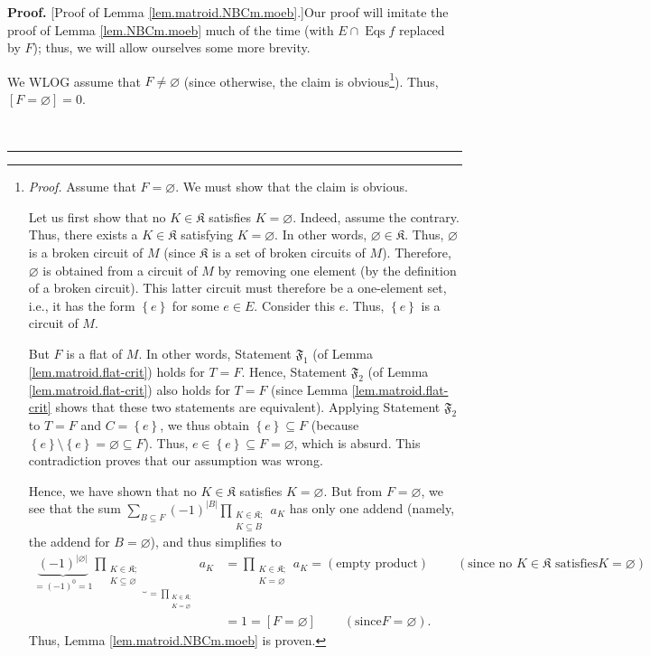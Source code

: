 \documentclass[numbers=enddot,12pt,final,onecolumn,notitlepage]{scrartcl}%
\theoremstyle{definition}
\newenvironment{proof}[1][Proof]{\noindent\textbf{#1.} }{\ \rule{0.5em}{0.5em}}
\let\sumnonlimits\sum
\let\prodnonlimits\prod
\renewcommand{\sum}{\sumnonlimits\limits}
\renewcommand{\prod}{\prodnonlimits\limits}
\begin{document}
\begin{proof}
[Proof of Lemma \ref{lem.matroid.NBCm.moeb}.]Our proof will imitate the proof
of Lemma \ref{lem.NBCm.moeb} much of the time (with $E\cap\operatorname*{Eqs}%
f$ replaced by $F$); thus, we will allow ourselves some more brevity.

We WLOG assume that $F\neq\varnothing$ (since otherwise, the claim is
obvious\footnote{\textit{Proof.} Assume that $F=\varnothing$. We must show
that the claim is obvious.
\par
Let us first show that no $K\in\mathfrak{K}$ satisfies $K=\varnothing$.
Indeed, assume the contrary. Thus, there exists a $K\in\mathfrak{K}$
satisfying $K=\varnothing$. In other words, $\varnothing\in\mathfrak{K}$.
Thus, $\varnothing$ is a broken circuit of $M$ (since $\mathfrak{K}$ is a set
of broken circuits of $M$). Therefore, $\varnothing$ is obtained from a
circuit of $M$ by removing one element (by the definition of a broken
circuit). This latter circuit must therefore be a one-element set, i.e., it
has the form $\left\{  e\right\}  $ for some $e\in E$. Consider this $e$.
Thus, $\left\{  e\right\}  $ is a circuit of $M$.
\par
But $F$ is a flat of $M$. In other words, Statement $\mathfrak{F}_{1}$ (of
Lemma \ref{lem.matroid.flat-crit}) holds for $T=F$. Hence, Statement
$\mathfrak{F}_{2}$ (of Lemma \ref{lem.matroid.flat-crit}) also holds for $T=F$
(since Lemma \ref{lem.matroid.flat-crit} shows that these two statements are
equivalent). Applying Statement $\mathfrak{F}_{2}$ to $T=F$ and $C=\left\{
e\right\}  $, we thus obtain $\left\{  e\right\}  \subseteq F$ (because
$\left\{  e\right\}  \setminus\left\{  e\right\}  =\varnothing\subseteq F$).
Thus, $e\in\left\{  e\right\}  \subseteq F=\varnothing$, which is absurd. This
contradiction proves that our assumption was wrong.
\par
Hence, we have shown that no $K\in\mathfrak{K}$ satisfies $K=\varnothing$. But
from $F=\varnothing$, we see that the sum $\sum_{B\subseteq F}\left(
-1\right)  ^{\left\vert B\right\vert }\prod_{\substack{K\in\mathfrak{K}%
;\\K\subseteq B}}a_{K}$ has only one addend (namely, the addend for
$B=\varnothing$), and thus simplifies to
\begin{align*}
\underbrace{\left(  -1\right)  ^{\left\vert \varnothing\right\vert }%
}_{=\left(  -1\right)  ^{0}=1}\underbrace{\prod_{\substack{K\in\mathfrak{K}%
;\\K\subseteq\varnothing}}}_{=\prod_{\substack{K\in\mathfrak{K}%
;\\K=\varnothing}}}a_{K}  &  =\prod_{\substack{K\in\mathfrak{K}%
;\\K=\varnothing}}a_{K}=\left(  \text{empty product}\right)
\ \ \ \ \ \ \ \ \ \ \left(  \text{since no }K\in\mathfrak{K}\text{ satisfies
}K=\varnothing\right) \\
&  =1=\left[  F=\varnothing\right]  \ \ \ \ \ \ \ \ \ \ \left(  \text{since
}F=\varnothing\right)  .
\end{align*}
Thus, Lemma \ref{lem.matroid.NBCm.moeb} is proven.}). Thus, $\left[
F=\varnothing\right]  =0$.


\end{proof}
\end{document}
